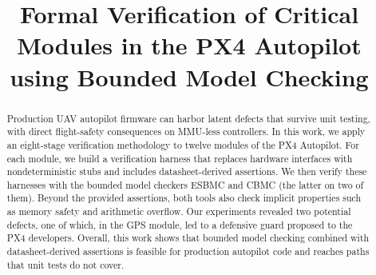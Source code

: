 \documentclass[conference]{IEEEtran}
\begin{document}
\title{Formal Verification of Critical Modules in the PX4 Autopilot
       using Bounded Model Checking\\
}


\author{
\and
{}
\and
{}
}

\maketitle

\begin{abstract}
Production UAV autopilot firmware can harbor latent defects that survive
unit testing, with direct flight-safety consequences on MMU-less
controllers. In this work, we apply an eight-stage verification methodology
to twelve modules of the PX4 Autopilot. For each module, we build
a verification harness that replaces hardware interfaces with
nondeterministic stubs and includes datasheet-derived assertions.
We then verify these harnesses with the bounded model checkers ESBMC and
CBMC (the latter on two of them). Beyond the provided assertions,
both tools also check implicit properties such as memory safety and
arithmetic overflow. Our experiments revealed two potential defects,
one of which, in the GPS module, led to a defensive guard proposed to
the PX4 developers. Overall, this work shows that bounded model
checking combined with datasheet-derived assertions is feasible for
production autopilot code and reaches paths that unit tests do not cover.
\end{abstract}
\end{document}
